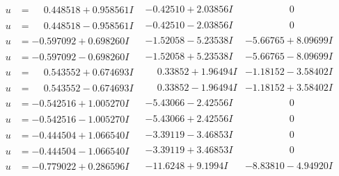 \documentclass[1p]{elsarticle_modified}
\theoremstyle{definition}
\begin{document}
$$\begin{array}{c|c|c}
\begin{aligned}
u &= \phantom{-}0.448518 + 0.958561 I\end{aligned}
 & -0.42510 + 2.03856 I & \phantom{-0.000000 } 0 \\ \hline\begin{aligned}
u &= \phantom{-}0.448518 - 0.958561 I\end{aligned}
 & -0.42510 - 2.03856 I & \phantom{-0.000000 } 0 \\ \hline\begin{aligned}
u &= -0.597092 + 0.698260 I\end{aligned}
 & -1.52058 - 5.23538 I & -5.66765 + 8.09699 I \\ \hline\begin{aligned}
u &= -0.597092 - 0.698260 I\end{aligned}
 & -1.52058 + 5.23538 I & -5.66765 - 8.09699 I \\ \hline\begin{aligned}
u &= \phantom{-}0.543552 + 0.674693 I\end{aligned}
 & \phantom{-}0.33852 + 1.96494 I & -1.18152 - 3.58402 I \\ \hline\begin{aligned}
u &= \phantom{-}0.543552 - 0.674693 I\end{aligned}
 & \phantom{-}0.33852 - 1.96494 I & -1.18152 + 3.58402 I \\ \hline\begin{aligned}
u &= -0.542516 + 1.005270 I\end{aligned}
 & -5.43066 - 2.42556 I & \phantom{-0.000000 } 0 \\ \hline\begin{aligned}
u &= -0.542516 - 1.005270 I\end{aligned}
 & -5.43066 + 2.42556 I & \phantom{-0.000000 } 0 \\ \hline\begin{aligned}
u &= -0.444504 + 1.066540 I\end{aligned}
 & -3.39119 - 3.46853 I & \phantom{-0.000000 } 0 \\ \hline\begin{aligned}
u &= -0.444504 - 1.066540 I\end{aligned}
 & -3.39119 + 3.46853 I & \phantom{-0.000000 } 0 \\ \hline\begin{aligned}
u &= -0.779022 + 0.286596 I\end{aligned}
 & -11.6248 + 9.1994 I & -8.83810 - 4.94920 I \\ \hline\begin{aligned}

\end{aligned}
\end{array}$$
\end{document}
